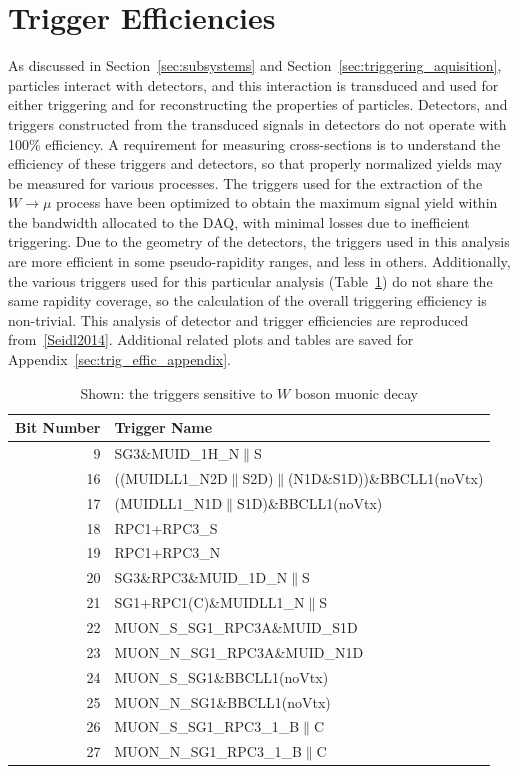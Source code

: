 \clearpage
\section{Trigger Efficiencies}

As discussed in Section~\ref{sec:subsystems} and
Section~\ref{sec:triggering_aquisition}, particles interact with detectors, and
this interaction is transduced and used for either triggering and for
reconstructing the properties of particles. Detectors, and triggers constructed
from the transduced signals in detectors do not operate with 100\% efficiency.
A requirement for measuring cross-sections is to understand the efficiency of
these triggers and detectors, so that properly normalized yields may be measured
for various processes. The triggers used for the extraction of the
$W\rightarrow\mu$ process have been optimized to obtain the maximum signal yield
within the bandwidth allocated to the DAQ, with minimal losses due to
inefficient triggering. Due to the geometry of the detectors, the triggers used
in this analysis are more efficient in some pseudo-rapidity ranges, and less in
others. Additionally, the various triggers used for this particular analysis
(Table~\ref{tab:w_triggers}) do not share the same rapidity coverage, so the
calculation of the overall triggering efficiency is non-trivial. This analysis
of detector and trigger efficiencies are reproduced from~\ref{Seidl2014}.
Additional related plots and tables are saved for
Appendix~\ref{sec:trig_effic_appendix}.

\begin{table}[ht]
  \centering
  \begin{tabular}{r l}
    \toprule
    \textbf{Bit Number} & \textbf{Trigger Name} \\ 
    \midrule
    9 & SG3\&MUID\_1H\_N$\|$S\\
    16 & ((MUIDLL1\_N2D$\|$S2D)$\|$(N1D\&S1D))\&BBCLL1(noVtx)\\
    17 & (MUIDLL1\_N1D$\|$S1D)\&BBCLL1(noVtx)\\
    18 & RPC1+RPC3\_S\\
    19 & RPC1+RPC3\_N\\
    20 & SG3\&RPC3\&MUID\_1D\_N$\|$S\\
    21 & SG1+RPC1(C)\&MUIDLL1\_N$\|$S\\
    22 & MUON\_S\_SG1\_RPC3A\&MUID\_S1D\\
    23 & MUON\_N\_SG1\_RPC3A\&MUID\_N1D\\
    24 & MUON\_S\_SG1\&BBCLL1(noVtx)\\
    25 & MUON\_N\_SG1\&BBCLL1(noVtx)\\
    26 & MUON\_S\_SG1\_RPC3\_1\_B$\|$C\\
    27 & MUON\_N\_SG1\_RPC3\_1\_B$\|$C\\ 
    \bottomrule
  \end{tabular}
  \caption{Shown: the triggers sensitive to $W$ boson muonic decay }
  \label{tab:w_triggers}
\end{table}
\clearpage


